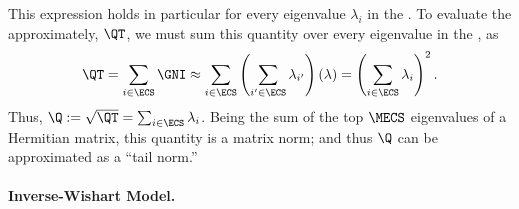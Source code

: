 This expression holds in particular for every eigenvalue $\lambda_i$ in the \ECS.
To evaluate the \QualitySquared approximately, $\QT$, we must sum this quantity over every eigenvalue in the \ECS, as
\begin{align}
  \label{eqn:spikes_model_4}
  \QT = \sum_{i\in\ECS}\GNI 
 \approx \sum_{i\in\ECS}\left(\sum_{i^{\prime}\in\ECS}\lambda_{i^{\prime}}\right)\left(\lambda\right)
 = \left(\sum_{i\in\ECS}\lambda_{i}\right)^{2}  .
\end{align}
Thus, $\Q:=\sqrt{\QT}=\sum_{i\in\ECS}\lambda_{i}$.
Being the sum of the top $\MECS$ eigenvalues of a Hermitian matrix, this quantity is a matrix norm; and thus $\Q$ can be approximated as a ``tail norm.''





\paragraph{Inverse-Wishart Model.}

